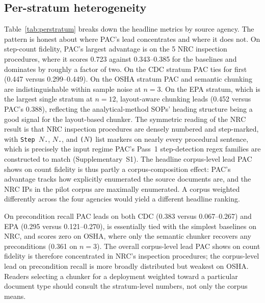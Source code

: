 \documentclass[fleqn,10pt]{wlscirep}
\begin{document}
\subsection*{Per-stratum heterogeneity}

Table~\ref{tab:perstratum} breaks down the headline metrics by source
agency. The pattern is honest about where PAC's lead concentrates and
where it does not. On step-count fidelity, PAC's largest advantage is
on the 5 NRC inspection procedures, where it scores 0.723 against
0.343--0.385 for the baselines and dominates by roughly a factor of
two. On the CDC stratum PAC ties for first (0.447 versus
0.299--0.449). On the OSHA stratum PAC and semantic chunking are
indistinguishable within sample noise at $n=3$. On the EPA stratum,
which is the largest single stratum at $n=12$, layout-aware chunking
leads (0.452 versus PAC's 0.388), reflecting the analytical-method
SOPs' heading structure being a good signal for the layout-based
chunker. The symmetric reading of the NRC result is that NRC
inspection procedures are densely numbered and step-marked, with
\texttt{Step~$N$.}, \texttt{$N$.}, and \texttt{($N$)} list markers on
nearly every procedural sentence, which is precisely the input regime
PAC's Pass~1 step-detection regex families are constructed to match
(Supplementary~S1). The headline corpus-level lead PAC shows on
count fidelity is thus partly a corpus-composition effect: PAC's
advantage tracks how explicitly enumerated the source documents are,
and the NRC IPs in the pilot corpus are maximally enumerated. A
corpus weighted differently across the four agencies would yield a
different headline ranking.

On precondition recall PAC leads on both CDC (0.383 versus
0.067--0.267) and EPA (0.295 versus 0.121--0.270), is essentially
tied with the simplest baselines on NRC, and scores zero on OSHA,
where only the semantic chunker recovers any preconditions (0.361 on
$n=3$). The overall corpus-level lead PAC shows on count fidelity is
therefore concentrated in NRC's inspection procedures; the
corpus-level lead on precondition recall is more broadly distributed
but weakest on OSHA. Readers selecting a chunker for a deployment
weighted toward a particular document type should consult the
stratum-level numbers, not only the corpus means.
\end{document}
